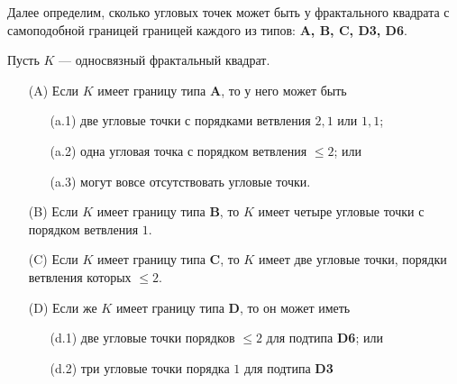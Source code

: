 Далее определим, сколько угловых точек может быть у фрактального квадрата с самоподобной границей границей каждого из типов: {\bf A, B, C, D3, D6}.

\begin{theorem}\label{thm:corner}
Пусть $K$ --- односвязный фрактальный квадрат.
\begin{itemize}[nolistsep]
\item[(A)] Если $K$ имеет границу типа  {\bf A}, то у него может быть
	\begin{itemize}[nolistsep]
	\item[(a.1)] две угловые точки с порядками ветвления $2,1$ или $1,1$;
	\item[(a.2)] одна угловая точка с порядком ветвления $\le 2$; или 
	\item[(a.3)] могут вовсе отсутствовать угловые точки.
	\end{itemize}
\item[(B)] Если $K$ имеет границу типа  {\bf B}, то $K$ имеет четыре угловые точки с порядком ветвления $1$.
\item[(C)] Если $K$ имеет границу типа {\bf C}, то $K$ имеет две угловые точки, порядки ветвления которых $\le 2$.
\item[(D)] Если же $K$ имеет границу типа {\bf D}, то он может иметь 
	\begin{itemize}[nolistsep]
	\item[(d.1)] две угловые точки порядков $\le 2$ для подтипа {\bf D6}; или
	\item[(d.2)] три угловые точки порядка $1$ для подтипа {\bf D3}
	\end{itemize}
\end{itemize}
\end{theorem}

